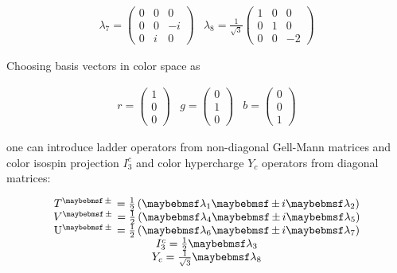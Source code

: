 \begin{subequations}
  \begin{equation} \label{lamdba7-8}
  \begin{array}{cc}
    \lambda_7 = \left(
    \begin{array}{ccc}
           0 & 0 & 0 \\
           0 & 0 & -i \\
           0 & i & 0
    \end{array} \right)
    &
    \lambda_8 = \frac{1}{\sqrt{3}} \left(
    \begin{array}{ccc}
           1 & 0 &  0 \\
           0 & 1 &  0 \\
           0 & 0 & -2
    \end{array} \right)
  \end{array}
  \end{equation}

\end{subequations}

Choosing basis vectors in color space as

\begin{equation}
  \begin{array}{ccc}
    r = \left( \begin{array}{c} 1 \\ 0 \\ 0 \end{array} \right) &
    g = \left( \begin{array}{c} 0 \\ 1 \\ 0 \end{array} \right) &
    b = \left( \begin{array}{c} 0 \\ 0 \\ 1 \end{array} \right)
  \end{array}
\end{equation}

one can introduce ladder operators from non-diagonal Gell-Mann matrices and
color isospin projection $I_3^c$ and color hypercharge $Y_c$ operators from
diagonal matrices:

\begin{equation} \label{eq:SU3_ladder_operators}
  \begin{array}{c}
    T^{\pm} = \frac{1}{2} \left(\lambda_1 \pm i\lambda_2 \right) \\
    V^{\pm} = \frac{1}{2} \left(\lambda_4 \pm i\lambda_5 \right) \\
    \U^{\pm} = \frac{1}{2} \left(\lambda_6 \pm i\lambda_7 \right) \\
    I_3^c = \frac{1}{2} \lambda_3 \\
    Y_c = \frac{1}{\sqrt{3}} \lambda_8
  \end{array}
\end{equation}

